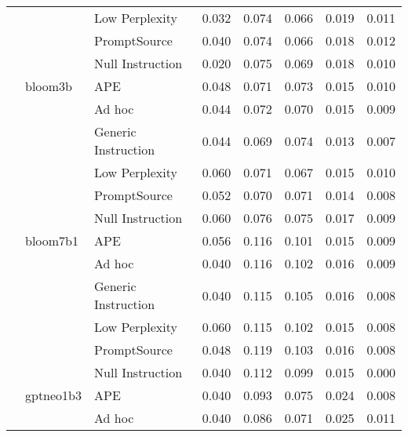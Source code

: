 \begin{supertabular}{lllrrrrr}
              &        & Low Perplexity &            0.032 &           0.074 &          0.066 &        0.019 &    0.011 \\
              &        & PromptSource &            0.040 &           0.074 &          0.066 &        0.018 &    0.012 \\
              &        & Null Instruction &            0.020 &           0.075 &          0.069 &        0.018 &    0.010 \\
              & bloom3b & APE &            0.048 &           0.071 &          0.073 &        0.015 &    0.010 \\
              &        & Ad hoc &            0.044 &           0.072 &          0.070 &        0.015 &    0.009 \\
              &        & Generic Instruction &            0.044 &           0.069 &          0.074 &        0.013 &    0.007 \\
              &        & Low Perplexity &            0.060 &           0.071 &          0.067 &        0.015 &    0.010 \\
              &        & PromptSource &            0.052 &           0.070 &          0.071 &        0.014 &    0.008 \\
              &        & Null Instruction &            0.060 &           0.076 &          0.075 &        0.017 &    0.009 \\
              & bloom7b1 & APE &            0.056 &           0.116 &          0.101 &        0.015 &    0.009 \\
              &        & Ad hoc &            0.040 &           0.116 &          0.102 &        0.016 &    0.009 \\
              &        & Generic Instruction &            0.040 &           0.115 &          0.105 &        0.016 &    0.008 \\
              &        & Low Perplexity &            0.060 &           0.115 &          0.102 &        0.015 &    0.008 \\
              &        & PromptSource &            0.048 &           0.119 &          0.103 &        0.016 &    0.008 \\
              &        & Null Instruction &            0.040 &           0.112 &          0.099 &        0.015 &      0.000 \\
              & gptneo1b3 & APE &            0.040 &           0.093 &          0.075 &        0.024 &    0.008 \\
              &        & Ad hoc &            0.040 &           0.086 &          0.071 &        0.025 &    0.011 \\

\end{supertabular}
